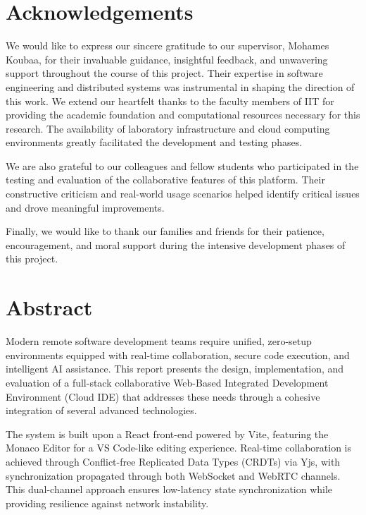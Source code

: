 \documentclass[12pt,a4paper,oneside]{report}
\newcommand{\reportsupervisor}{Mohames Koubaa}
\begin{document}

\chapter*{Acknowledgements}
\onehalfspacing

We would like to express our sincere gratitude to our supervisor, \reportsupervisor, for their invaluable guidance, insightful feedback, and unwavering support throughout the course of this project. Their expertise in software engineering and distributed systems was instrumental in shaping the direction of this work.
We extend our heartfelt thanks to the faculty members of IIT for providing the academic foundation and computational resources necessary for this research. The availability of laboratory infrastructure and cloud computing environments greatly facilitated the development and testing phases.

We are also grateful to our colleagues and fellow students who participated in the testing and evaluation of the collaborative features of this platform. Their constructive criticism and real-world usage scenarios helped identify critical issues and drove meaningful improvements.

Finally, we would like to thank our families and friends for their patience, encouragement, and moral support during the intensive development phases of this project.

\newpage
\chapter*{Abstract}

Modern remote software development teams require unified, zero-setup environments equipped with real-time collaboration, secure code execution, and intelligent AI assistance. This report presents the design, implementation, and evaluation of a full-stack collaborative Web-Based Integrated Development Environment (Cloud IDE) that addresses these needs through a cohesive integration of several advanced technologies.

The system is built upon a React front-end powered by Vite, featuring the Monaco Editor for a VS Code-like editing experience. Real-time collaboration is achieved through Conflict-free Replicated Data Types (CRDTs) via Yjs, with synchronization propagated through both WebSocket and WebRTC channels. This dual-channel approach ensures low-latency state synchronization while providing resilience against network instability.
\end{document}
